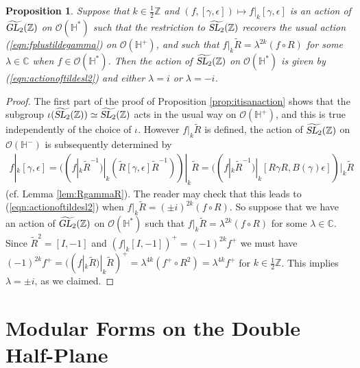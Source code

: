 \documentclass[aps,prd,groupedaddress,preprint,tightenlines,eqsecnum,nofootinbib]{revtex4}
\newcommand{\g}{\gamma}
\newcommand{\e}{\epsilon}
\newcommand{\SL}{\operatorname{\textsl{SL}}}      %
\newcommand{\GL}{\operatorname{\textsl{GL}}}      %
\newcommand{\C}{{\mathbb C}}%
\newcommand{\Z}{{\mathbb Z}}%
\newcommand{\HH}{{\mathbb H}}%
\newcommand{\WT}{\widetilde}
\newtheorem{prop}[thm]{Proposition}
\begin{document}
\begin{prop}\label{prop:uniquenessofRaction}
Suppose that $k\in \frac12\Z$ and $(f,[\gamma,\e])\mapsto f|_k[\gamma,\e]$ is an action of $\widetilde{\GL_2}(\Z)$ on $\mathcal{O}(\HH^*)$ such that the restriction to $\widetilde{\SL_2}(\Z)$ recovers the usual action (\ref{eqn:fplustildegamma}) on $\mathcal{O}(\HH^+)$, and such that $f|_k\WT R=\lambda^{2k}(f\circ R)$ for some $\lambda\in \C$ when $f\in \mathcal{O}(\HH^*)$. Then the action of $\widetilde{\SL_2}(\Z)$ on $\mathcal{O}(\HH^*)$ is given by (\ref{eqn:actionoftildesl2}) and either $\lambda=i$ or $\lambda=-i$.
\end{prop}

\begin{proof}
The first part of the proof of Proposition \ref{prop:itisanaction} shows that the subgroup $\iota(\widetilde{\SL_2}(\Z))\simeq \widetilde{\SL_2}(\Z)$ acts in the usual way on $\mathcal{O}(\HH^+)$, and this is true independently of the choice of $\iota$. However $f|_k\WT R$ is defined, the action of $\widetilde{\SL_2}(\Z)$ on $\mathcal{O}(\HH^-)$ is subsequently determined by 
\begin{gather}
	f|_k[\g,\e]=((f|_k \WT R^{-1})|_k(\WT R[\g,\e]\WT R^{-1}))|_k\WT R
	=((f|_k\WT R^{-1})|_k [R\g R,B(\g)\e])|_k\WT R
\end{gather}
(cf. Lemma \ref{lem:RgammaR}). The reader may check that this leads to (\ref{eqn:actionoftildesl2}) when $f|_k\WT R=(\pm i)^{2k}(f\circ R)$. So suppose that we have an action of $\widetilde{\GL_2}(\Z)$ on $\mathcal{O}(\HH^*)$ such that $f|_k\WT R=\lambda^{2k}(f\circ R)$ for some $\lambda\in \C$. Since $\WT R^2=[I,-1]$ and $(f|_k[I,-1])^+=(-1)^{2k}f^+$ we must have $(-1)^{2k}f^+=((f|_k\WT R)|_k\WT R)^+=\lambda^{4k}(f^+\circ R^2)=\lambda^{4k}f^+$ for $k\in \frac12\Z$. This implies $\lambda=\pm i$, as we claimed.
\end{proof}

\section{Modular Forms on the Double Half-Plane}
\label{sec:mdlfmsgl2}
\end{document}
